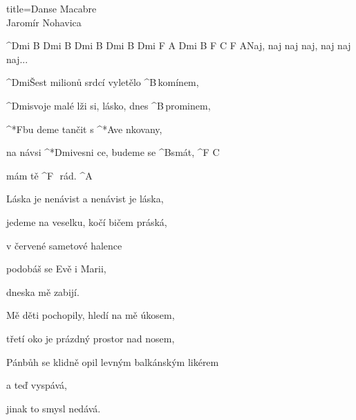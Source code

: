 \begin{song}{title=\predtitle\centering Danse Macabre \\\large Jaromír Nohavica \vspace*{-0.3cm}}  %
\begin{centerjustified}
\nejnejvetsi

	^{Dmi B Dmi B Dmi B Dmi B Dmi F A Dmi B F C F A}{Naj, naj naj naj, naj naj naj\elipsa.\elipsa.\elipsa. \textcolor{white}{\hrulefill }}

\sloka
	^{Dmi}Šest milionů srdcí vyletělo ^{\z B\,}komínem,

	^{Dmi}svoje malé lži si, lásko, dnes ^{\z B\,}prominem,

	^*{F}bu deme tančit s ^*{A}ve nkovany,

	na návsi ^*{Dmi}vesni ce, budeme se ^{B\z }smát, ^{F\,\,C}

	mám tě ^{F\,\,\,\,}rád. ^{A}


\sloka
	Láska je nenávist a nenávist je láska,

	jedeme na veselku, kočí bičem práská,

	v červené sametové halence

	podobáš se Evě i Marii,

	dneska mě zabijí.


\sloka
	Mě děti pochopily, hledí na mě úkosem,

	třetí oko je prázdný prostor nad nosem,

	Pánbůh se klidně opil levným balkánským likérem

	a teď vyspává,

	jinak to smysl nedává.

\end{centerjustified}
\setcounter{Slokočet}{0}
\end{song}
